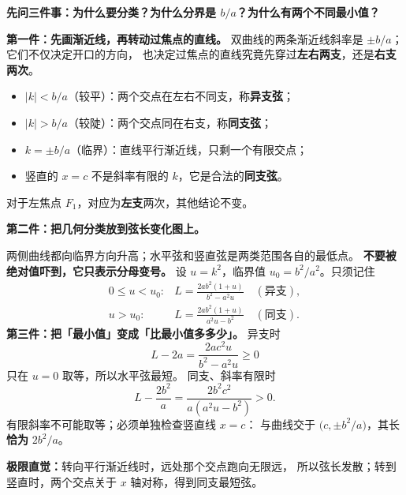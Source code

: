 \clearpage
\begin{explanationbox}
\textbf{先问三件事：为什么要分类？为什么分界是 $b/a$？为什么有两个不同最小值？}

\textbf{第一件：先画渐近线，再转动过焦点的直线。}
双曲线的两条渐近线斜率是 $\pm b/a$；它们不仅决定开口的方向，
也决定过焦点的直线究竟先穿过\textbf{左右两支}，还是\textbf{右支两次}。
\begin{itemize}
\item $|k|<b/a$（较平）：两个交点在左右不同支，称\textbf{异支弦}；
\item $|k|>b/a$（较陡）：两个交点同在右支，称\textbf{同支弦}；
\item $k=\pm b/a$（临界）：直线平行渐近线，只剩一个有限交点；
\item 竖直的 $x=c$ 不是斜率有限的 $k$，它是合法的\textbf{同支弦}。
\end{itemize}
对于左焦点 $F_1$，对应为\textbf{左支}两次，其他结论不变。
\begin{center}\end{center}

\tcbbreak
\textbf{第二件：把几何分类放到弦长变化图上。}
\begin{center}\end{center}
两侧曲线都向临界方向升高；水平弦和竖直弦是两类范围各自的最低点。
\textbf{不要被绝对值吓到，它只表示分母变号。}
设 $u=k^2$，临界值 $u_0=b^2/a^2$。只须记住
\[
\begin{array}{ll}
0\le u<u_0:& \displaystyle L=\frac{2ab^2(1+u)}{b^2-a^2u}\quad(\text{异支}),\\[5pt]
u>u_0:& \displaystyle L=\frac{2ab^2(1+u)}{a^2u-b^2}\quad(\text{同支}).
\end{array}
\]
\textbf{第三件：把「最小值」变成「比最小值多多少」。}
异支时
\[
\boxed{L-2a=\frac{2ac^2u}{b^2-a^2u}\ge0}
\]
只在 $u=0$ 取等，所以水平弦最短。
同支、斜率有限时
\[
\boxed{L-\frac{2b^2}{a}=
\frac{2b^2c^2}{a(a^2u-b^2)}>0.}
\]
有限斜率不可能取等；必须单独检查竖直线 $x=c$：
与曲线交于 $\bigl(c,\pm b^2/a\bigr)$，其长\textbf{恰为} $2b^2/a$。

\textbf{极限直觉：}转向平行渐近线时，远处那个交点跑向无限远，
所以弦长发散；转到竖直时，两个交点关于 $x$ 轴对称，得到同支最短弦。
\end{explanationbox}
